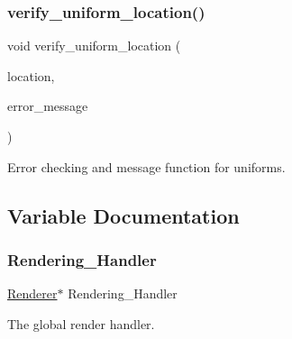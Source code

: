 \subsubsection{\texorpdfstring{verify\+\_\+uniform\+\_\+location()}{verify\_uniform\_location()}}
{\footnotesize\ttfamily void verify\+\_\+uniform\+\_\+location (\begin{DoxyParamCaption}\item[{G\+Lint}]{location,  }\item[{string}]{error\+\_\+message }\end{DoxyParamCaption})\hspace{0.3cm}{\ttfamily [inline]}}

Error checking and message function for uniforms. 

\subsection{Variable Documentation}
\mbox{\label{OpenGL-Wrappers_8cpp_a21679bfe3ff6515d046879b080ac8ca9}} 
\subsubsection{\texorpdfstring{Rendering\+\_\+\+Handler}{Rendering\_Handler}}
{\footnotesize\ttfamily \mbox{\hyperlink{classRenderer}{Renderer}}$\ast$ Rendering\+\_\+\+Handler}



The global render handler. 

